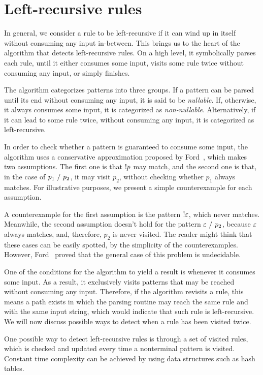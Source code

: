\section{Left-recursive rules}
\label{section:lr-rules}

In general,
we consider a rule to be left-recursive
if it can wind up in itself
without consuming any input in-between.
This brings us to the heart
of the algorithm that
detects left-recursive rules.
On a high level,
it symbolically parses each rule,
until it either consumes some input,
visits some rule twice without consuming any input,
or simply finishes.

The algorithm categorizes patterns into three groups.
If a pattern can be parsed until its end without consuming any input,
it is said to be \emph{nullable}.
If, otherwise, it always consumes some input,
it is categorized as \emph{non-nullable}.
Alternatively, if it can lead to some rule twice,
without consuming any input,
it is categorized as left-recursive.

In order to check whether a pattern
is guaranteed to consume some input,
the algorithm uses a conservative approximation
proposed by Ford~\cite{ford_parsing_2004},
which makes two assumptions.
The first one is that $!p$ may match,
and the second one is that,
in the case of $p_1\ /\ p_2$,
it may visit $p_2$,
without checking whether $p_1$ always matches.
For illustrative purposes,
we present a simple counterexample
for each assumption.

A counterexample for the first assumption
is the pattern $!\varepsilon$,
which never matches.
Meanwhile, the second assumption doesn't hold
for the pattern $\varepsilon\ /\ p_2$,
because $\varepsilon$ always matches,
and, therefore, $p_2$ is never visited.
The reader might think that
these cases can be easily spotted,
by the simplicity of the counterexamples.
However,
Ford~\cite{ford_parsing_2004} proved that
the general case of this problem is undecidable.

One of the conditions for the algorithm to yield a result
is whenever it consumes some input.
As a result,
it exclusively visits patterns that may be reached
without consuming any input.
Therefore, if the algorithm revisits a rule,
this means a path exists in which
the parsing routine may reach the same rule
and with the same input string,
which would indicate that such rule is left-recursive.
We will now discuss possible ways to detect
when a rule has been visited twice.

One possible way to detect left-recursive rules
is through a set of visited rules,
which is checked and updated
every time a nonterminal pattern is visited.
Constant time complexity
can be achieved
by using data structures
such as hash tables.

